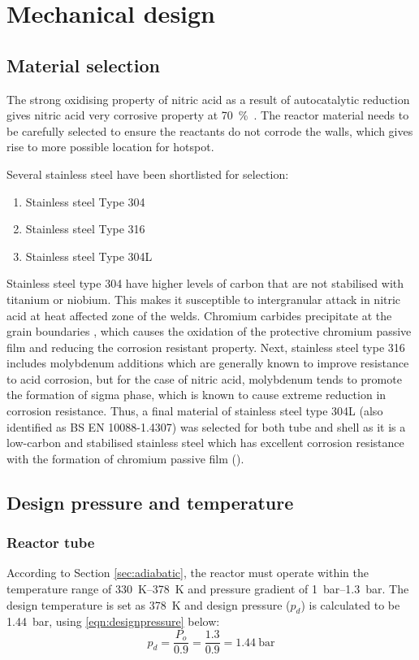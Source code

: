 \section{Mechanical design}
\subsection{Material selection}
The strong oxidising property of nitric acid as a result of autocatalytic reduction \cite{suresh_corrosion_nodate} gives nitric acid very corrosive property at \SI{70}{\percent\wv}. The reactor material needs to be carefully selected to ensure the reactants do not corrode the walls, which gives rise to more possible location for hotspot.

Several stainless steel have been shortlisted for selection: 
\begin{enumerate}
    \item Stainless steel Type 304
    \item Stainless steel Type 316
    \item Stainless steel Type 304L
\end{enumerate}

Stainless steel type 304 have higher levels of carbon that are not stabilised with titanium or niobium. This makes it susceptible to intergranular attack in nitric acid at heat affected zone of the welds. Chromium carbides precipitate at the grain boundaries \cite{cm_selection_nodate}, which causes the oxidation of the protective chromium passive film and reducing the corrosion resistant property. Next, stainless steel type 316 includes molybdenum additions which are generally known to improve resistance to acid corrosion, but for the case of nitric acid, molybdenum tends to promote the formation of sigma phase, which is known to cause extreme reduction in corrosion resistance. Thus, a final material of stainless steel type 304L (also identified as BS EN 10088-1.4307) was selected for both tube and shell as it is a low-carbon and stabilised stainless steel which has excellent corrosion resistance with the formation of chromium passive film \cite{ningshen_corrosion_2011} ().

\subsection{Design pressure and temperature}
\subsubsection{Reactor tube}
According to Section \ref{sec:adiabatic}, the reactor must operate within the temperature range of \SIrange{330}{378}{\K} and pressure gradient of \SIrange{1}{1.3}{\bar}. The design temperature is set as \SI{378}{\K} and design pressure ($p_d$) is calculated to be \SI{1.44}{\bar}, using \cref{eqn:designpressure} below:
\begin{equation}
    p_d = \frac{P_o}{0.9} = \frac{1.3}{0.9} = \SI{1.44}{\bar}
    \label{eqn:designpressure}
\end{equation}

